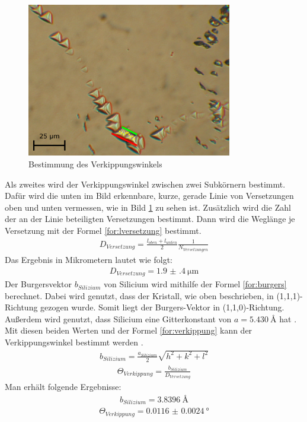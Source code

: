 \documentclass[german, %
parskip=full, %
bibliography=totoc, %
]{scrartcl}
\begin{document}
\begin{figure}[ht] 
  \centering
     \includegraphics[width=0.8\textwidth]{Silicium_3_50_mal_verkippung}
  \caption{Bestimmung des Verkippungswinkels}
  \label{fig:verkippung}
\end{figure}

Als zweites wird der Verkippungswinkel zwischen zwei Subkörnern bestimmt. Dafür wird die unten im Bild erkennbare, kurze, gerade Linie von Versetzungen oben und unten vermessen, wie in Bild \ref{fig:verkippung} zu sehen ist. Zusätzlich wird die Zahl der an der Linie beteiligten Versetzungen bestimmt. Dann wird die Weglänge je Versetzung mit der Formel \ref{for:lversetzung} bestimmt.
\begin{align}
D_{Versetzung} = \frac{l_{oben} + l_{unten}}{2} \frac{1}{N_{Versetzungen}} \label{for:lversetzung}
\end{align}
Das Ergebnis in Mikrometern lautet wie folgt:
\begin{align*}
D_{Versetzung} = \SI[separate-uncertainty = true]{1.9(4)}{\micro\meter}
\end{align*}
Der Burgersvektor $b_{Silizium}$ von Silicium wird mithilfe der Formel \ref{for:burgers} berechnet. Dabei wird genutzt, dass der Kristall, wie oben beschrieben, in (1,1,1)-Richtung gezogen wurde. Somit liegt der Burgers-Vektor in (1,1,0)-Richtung. Außerdem wird genutzt, dass Silicium eine Gitterkonstant von $a = \SI{5.430}{\angstrom}$ hat \cite[S.24]{kittel}. Mit diesen beiden Werten und der Formel \ref{for:verkippung} kann der Verkippungswinkel bestimmt werden \cite[S.661]{kittel}.
\begin{align}
b_{Silizium} = \frac{a_{Silizium}}{2}\sqrt{h^2+k^2+l^2} \label{for:burgers}
\end{align}
\begin{align}
\Theta_{Verkippung} = \frac{b_{Silizium}}{D_{Versetzung}} \label{for:verkippung}
\end{align}
Man erhält folgende Ergebnisse:
\begin{align*}
b_{Silizium} = \SI{3.8396}{\angstrom}
\end{align*}
\begin{align*}
\Theta_{Verkippung} = \SI[separate-uncertainty = true]{0.0116(24)}{\degree}
\end{align*}
\end{document}
